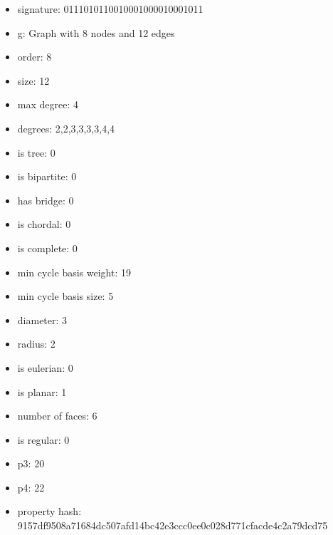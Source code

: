 \begin{itemize}
\item signature: 0111010110010001000010001011
\item g: Graph with 8 nodes and 12 edges
\item order: 8
\item size: 12
\item max degree: 4
\item degrees: 2,2,3,3,3,3,4,4
\item is tree: 0
\item is bipartite: 0
\item has bridge: 0
\item is chordal: 0
\item is complete: 0
\item min cycle basis weight: 19
\item min cycle basis size: 5
\item diameter: 3
\item radius: 2
\item is eulerian: 0
\item is planar: 1
\item number of faces: 6
\item is regular: 0
\item p3: 20
\item p4: 22
\item property hash: 9157df9508a71684dc507afd14bc42e3ccc0ee0c028d771cfacde4c2a79dcd75
\end{itemize}
\newpage
\begin{figure}
\end{figure}
